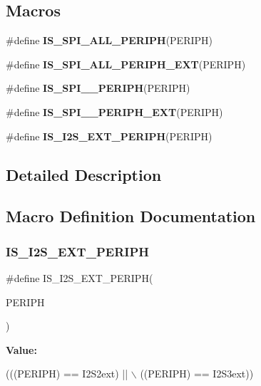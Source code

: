 \subsection*{Macros}
\begin{DoxyCompactItemize}
\item 
\#define \textbf{ I\+S\+\_\+\+S\+P\+I\+\_\+\+A\+L\+L\+\_\+\+P\+E\+R\+I\+PH}(P\+E\+R\+I\+PH)
\item 
\#define \textbf{ I\+S\+\_\+\+S\+P\+I\+\_\+\+A\+L\+L\+\_\+\+P\+E\+R\+I\+P\+H\+\_\+\+E\+XT}(P\+E\+R\+I\+PH)
\item 
\#define \textbf{ I\+S\+\_\+\+S\+P\+I\+\_\+\_\+\+P\+E\+R\+I\+PH}(P\+E\+R\+I\+PH)
\item 
\#define \textbf{ I\+S\+\_\+\+S\+P\+I\+\_\+\_\+\+P\+E\+R\+I\+P\+H\+\_\+\+E\+XT}(P\+E\+R\+I\+PH)
\item 
\#define \textbf{ I\+S\+\_\+\+I2\+S\+\_\+\+E\+X\+T\+\_\+\+P\+E\+R\+I\+PH}(P\+E\+R\+I\+PH)
\end{DoxyCompactItemize}


\subsection{Detailed Description}


\subsection{Macro Definition Documentation}
\mbox{\label{group__SPI__Exported__Constants_gaed21835cf2bf6c9469dedaa8720627c2}} 
\subsubsection{I\+S\+\_\+\+I2\+S\+\_\+\+E\+X\+T\+\_\+\+P\+E\+R\+I\+PH}
{\footnotesize\ttfamily \#define I\+S\+\_\+\+I2\+S\+\_\+\+E\+X\+T\+\_\+\+P\+E\+R\+I\+PH(\begin{DoxyParamCaption}\item[{}]{P\+E\+R\+I\+PH }\end{DoxyParamCaption})}

{\bfseries Value\+:}
\begin{DoxyCode}
(((PERIPH) == I2S2ext) || \(\backslash\)
                                    ((PERIPH) == I2S3ext))
\end{DoxyCode}


